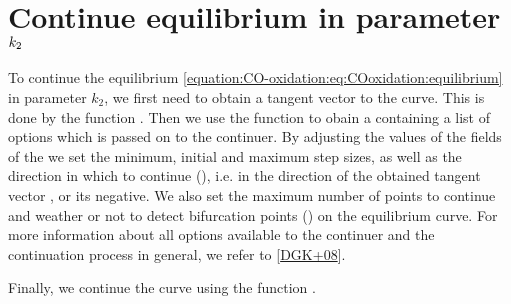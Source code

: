 \documentclass[letterpaper,10pt,english]{jupyterBook}
\begin{document}
\section{Continue equilibrium in parameter \protect\(k_2\protect\)}
\label{\detokenize{CO-oxidation:continue-equilibrium-in-parameter-k-2}}
\sphinxAtStartPar
To continue the equilibrium \eqref{equation:CO-oxidation:eq:COoxidation:equilibrium} in parameter
\(k_2\), we first need to obtain a tangent vector to the curve. This is done by
the function . Then we use the function  to obain a
 containing a list of options which is passed on to the continuer. By
adjusting the values of the fields of the   we set the minimum,
initial and maximum step sizes, as well as the direction in which to
continue (), i.e. in the direction of the obtained tangent vector
, or its negative. We also set the maximum number of points to
continue and weather or not to detect bifurcation points ()
on the equilibrium curve. For more information about all options available to
the  continuer and the continuation process in general, we refer to
{[}\hyperlink{cite.references:id14}{DGK+08}{]}.

\sphinxAtStartPar
Finally, we continue the curve using the function .

\begin{sphinxVerbatim}[commandchars=\\\{\}]
\PYG{p}{[}\PYG{p}{]}
\PYG{p}{[}\PYG{p}{]}
\end{sphinxVerbatim}
\end{document}
